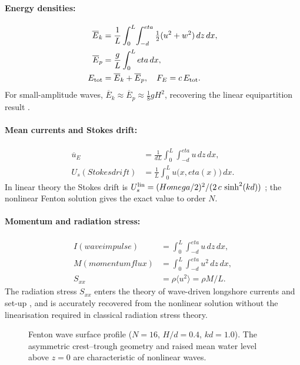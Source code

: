 \documentclass[journal,10pt,twocolumn]{IEEEtran}
\def\omega{omega}%
\def\eta{eta}%
\def\text#1{#1}%
\def\;{ }%
\newcommand{\Ebar}{\overline{E}}
\newcommand{\ubar}{\overline{u}}
\newcommand{\half}{\tfrac{1}{2}}
\begin{document}
\paragraph{Energy densities:}
\begin{align}
    \Ebar_k &= \frac{1}{L}\int_0^L\!\int_{-d}^{\eta}
               \half(u^2+w^2)\,dz\,dx,\\
    \Ebar_p &= \frac{g}{L}\int_0^L \eta\,dx,\\
    E_{\rm tot} &= \Ebar_k + \Ebar_p,
    \quad F_E = c\,E_{\rm tot}.
\end{align}
For small-amplitude waves, $\Ebar_k \approx \Ebar_p \approx \frac{1}{8}gH^2$,
recovering the linear equipartition result \cite{Mei1989}.

\paragraph{Mean currents and Stokes drift:}
\begin{align}
    \ubar_E &= \frac{1}{dL}\int_0^L\!\int_{-d}^{\eta} u\,dz\,dx,\\
    U_s\;(\text{Stokes drift})
    &= \frac{1}{L}\int_0^L u\bigl(x,\eta(x)\bigr)\,dx.
\end{align}
In linear theory the Stokes drift is
$U_s^{\rm lin} = (H\omega/2)^2/(2\,c\,\sinh^2(kd))$
\cite{Longuet-Higgins1953};
the nonlinear Fenton solution gives the exact value to order $N$.

\paragraph{Momentum and radiation stress:}
\begin{align}
    I\;(\text{wave impulse})
    &= \int_0^L\!\int_{-d}^{\eta} u\,dz\,dx,\\
    M\;(\text{momentum flux})
    &= \int_0^L\!\int_{-d}^{\eta} u^2\,dz\,dx,\\
    S_{xx}
    &= \rho\langle u^2\rangle = \rho M/L.
\end{align}
The radiation stress $S_{xx}$ enters the theory of wave-driven
longshore currents and set-up
\cite{LonguetHigginsStewart1964}, and is accurately recovered from the
nonlinear solution without the linearisation required in classical
radiation stress theory.

\begin{figure}[!t]
    \centering
    \resizebox{\linewidth}{!}{}
    \caption{Fenton wave surface profile ($N=16$, $H/d=0.4$, $kd=1.0$).
             The asymmetric crest--trough geometry and raised mean water
             level above $z=0$ are characteristic of nonlinear waves.}
    \label{fig:waveProfile}
\end{figure}
\end{document}
